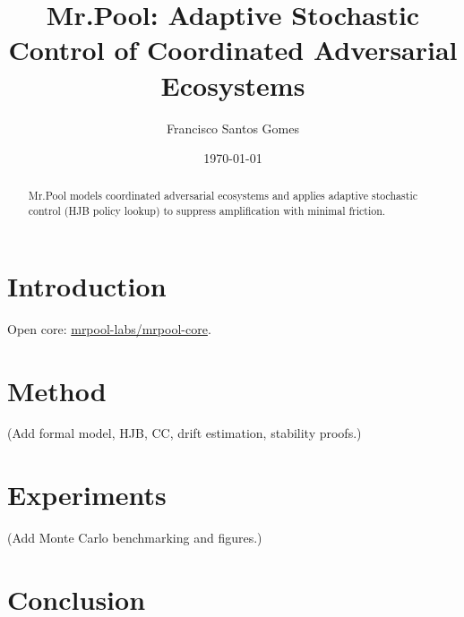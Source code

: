 \documentclass[11pt]{article}
\title{Mr.Pool: Adaptive Stochastic Control of Coordinated Adversarial Ecosystems}
\author{Francisco Santos Gomes}
\date{\today}
\begin{document}
\maketitle
\begin{abstract}
Mr.Pool models coordinated adversarial ecosystems and applies adaptive stochastic control (HJB policy lookup)
to suppress amplification with minimal friction.
\end{abstract}
\section{Introduction}
Open core: \href{https://github.com/mrpool-labs/mrpool-core}{mrpool-labs/mrpool-core}.
\section{Method}
(Add formal model, HJB, CC, drift estimation, stability proofs.)
\section{Experiments}
(Add Monte Carlo benchmarking and figures.)
\section{Conclusion}
\end{document}
